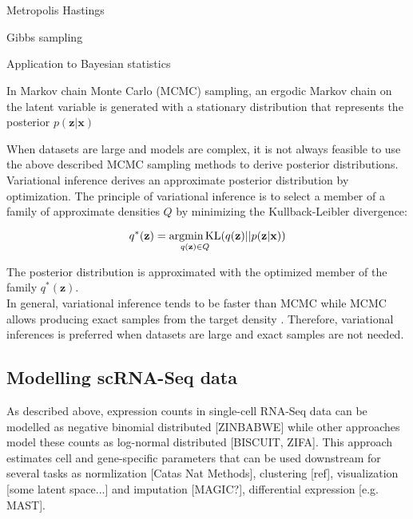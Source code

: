 \\

\\

Metropolis Hastings \citep{Metropolis1953, Hastings1970}

Gibbs sampling \citep{Geman1984}

Application to Bayesian statistics \citep{Gelfand1990}

In Markov chain Monte Carlo (MCMC) sampling, an ergodic Markov chain on the latent variable is generated with a stationary distribution that represents the posterior $p(\mathbf{z}|\mathbf{x})$  


When datasets are large and models are complex, it is not always feasible to use the above described MCMC sampling methods to derive posterior distributions. Variational inference derives an approximate posterior distribution by optimization. The principle of variational inference is to select a member of a family of approximate densities $Q$ by minimizing the Kullback-Leibler divergence:

\begin{equation}
q^\ast(\mathbf{z})=\underset{q(\mathbf{z})\in{}Q}{\textnormal{argmin\,{}KL}}(q(\mathbf{z})||p(\mathbf{z}|\mathbf{x}))
\end{equation}

The posterior distribution is approximated with the optimized member of the family $q^\ast(\mathbf{z})$\citep{Blei2017}.\\
In general, variational inference tends to be faster than MCMC while MCMC allows producing exact samples from the target density \citep{Blei2017}. Therefore, variational inferences is preferred when datasets are large and exact samples are not needed.


\subsection{Modelling scRNA-Seq data}

As described above, expression counts in single-cell RNA-Seq data can be modelled as negative binomial distributed [ZINBABWE] while other approaches model these counts as log-normal distributed [BISCUIT, ZIFA]. This approach estimates cell and gene-specific parameters that can be used downstream for several tasks as normlization [Catas Nat Methods], clustering [ref], visualization [some latent space...] and imputation [MAGIC?], differential expression [e.g. MAST].  

